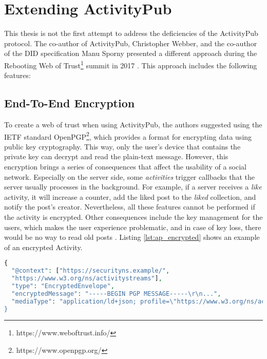 \section{Extending ActivityPub}\label{sec:extending_activitypub}

This thesis is not the first attempt to address the deficiencies of the ActivityPub protocol. The co-author of ActivityPub, Christopher Webber, and the co-author of the DID specification Manu Sporny presented a different approach during the Rebooting Web of Trust\footnote{https://www.weboftrust.info/} summit in 2017 \cite{webber_sporny_2017}. This approach includes the following features:

\subsection*{\textbf{End-To-End Encryption}}\label{subsec:e2e}

To create a web of trust when using ActivityPub, the authors suggested using the IETF standard OpenPGP\footnote{https://www.openpgp.org/}, which provides a format for encrypting data using public key cryptography. This way, only the user's device that contains the private key can decrypt and read the plain-text message. However, this encryption brings a series of consequences that affect the usability of a social network. Especially on the server side, some \emph{activities} trigger callbacks that the server usually processes in the background. For example, if a server receives a \emph{like} activity, it will increase a counter, add the liked post to the \emph{liked} collection, and notify the post's creator. Nevertheless, all these features cannot be performed if the activity is encrypted. Other consequences include the key management for the users, which makes the user experience problematic, and in case of key loss, there would be no way to read old posts \cite{webber_sporny_2017}. Listing \ref{lst:ap_encrypted} shows an example of an encrypted Activity.

\lstset{style=JSONStyle}
\begin{lstlisting}[language=PHP, caption=Note object with encrypted content \cite{webber_sporny_2017}, label=lst:ap_encrypted, float=h]
{
  "@context": ["https://securityns.example/",
  "https://www.w3.org/ns/activitystreams"],
  "type": "EncryptedEnvelope",
  "encryptedMessage": "-----BEGIN PGP MESSAGE-----\r\n...",
  "mediaType": "application/ld+json; profile=\"https://www.w3.org/ns/activitystreams\"
}
\end{lstlisting}


